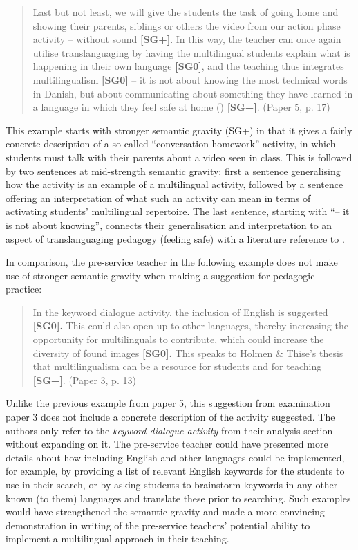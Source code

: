 \documentclass[output=paper]{langscibook}
\begin{document}
\begin{quote}
Last but not least, we will give the students the task of going home and showing their parents, siblings or others the video from our action phase activity – without sound \textbf{[SG+]}. In this way, the teacher can once again utilise translanguaging by having the multilingual students explain what is happening in their own language \textbf{[SG0]}, and the teaching thus integrates multilingualism \textbf{[SG0]} – it is not about knowing the most technical words in Danish, but about communicating about something they have learned in a language in which they feel safe at home (\citealt{HolmenThise2019}) \textbf{[SG−]}. (Paper 5, p. 17)
\end{quote}

This example starts with stronger semantic gravity (SG+) in that it gives a fairly concrete description of a so-called “conversation homework” activity, in which students must talk with their parents about a video seen in class. This is followed by two sentences at mid-strength semantic gravity: first a sentence generalising how the activity is an example of a multilingual activity, followed by a sentence offering an interpretation of what such an activity can mean in terms of activating students’ multilingual repertoire. The last sentence, starting with “– it is not about knowing”, connects their generalisation and interpretation to an aspect of translanguaging pedagogy (feeling safe) with a literature reference to \citet{HolmenThise2019}.

In comparison, the pre-service teacher in the following example does not make use of stronger semantic gravity when making a suggestion for pedagogic practice:

\begin{quote}
In the keyword dialogue activity, the inclusion of English is suggested \textbf{[SG0].} This could also open up to other languages, thereby increasing the opportunity for multilinguals to contribute, which could increase the diversity of found images \textbf{[SG0].} This speaks to Holmen \& Thise's thesis that multilingualism can be a resource for students and for teaching \textbf{[SG−]}. (Paper 3, p. 13)
\end{quote}

Unlike the previous example from paper 5, this suggestion from examination paper 3 does not include a concrete description of the activity suggested. The authors only refer to the \textit{keyword dialogue activity} from their analysis section without expanding on it. The pre-service teacher could have presented more details about how including English and other languages could be implemented, for example, by providing a list of relevant English keywords for the students to use in their search, or by asking students to brainstorm keywords in any other known (to them) languages and translate these prior to searching. Such examples would have strengthened the semantic gravity and made a more convincing demonstration in writing of the pre-service teachers’ potential ability to implement a multilingual approach in their teaching.
\end{document}
